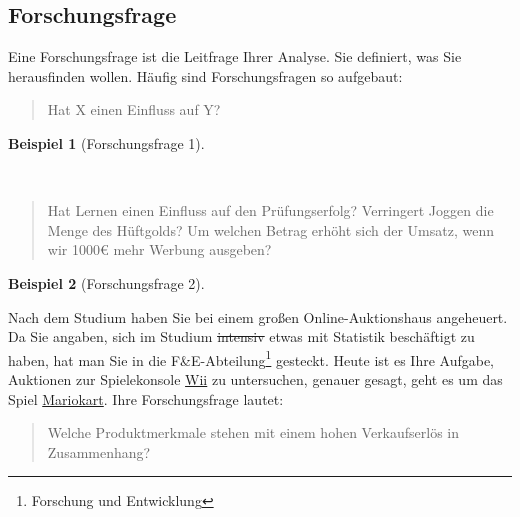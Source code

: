 \documentclass[
  a4paper,
  DIV=11]{scrreprt}
\theoremstyle{definition}
\theoremstyle{definition}
\newtheorem{example}{Beispiel}[chapter]
\theoremstyle{remark}
\begin{document}
\hypertarget{forschungsfrage}{%
\subsection{Forschungsfrage}\label{forschungsfrage}}

Eine Forschungsfrage ist die Leitfrage Ihrer Analyse. Sie definiert, was
Sie herausfinden wollen. Häufig sind Forschungsfragen so aufgebaut:

\begin{quote}
Hat X einen Einfluss auf Y?
\end{quote}

\leavevmode{}%
\begin{example}[Forschungsfrage 1]\label{exm-fofrage1}

~

\begin{quote}
Hat Lernen einen Einfluss auf den Prüfungserfolg? Verringert Joggen die
Menge des Hüftgolds? Um welchen Betrag erhöht sich der Umsatz, wenn wir
1000€ mehr Werbung ausgeben?
\end{quote}

\end{example}

\leavevmode{}%
\begin{example}[Forschungsfrage 2]\label{exm-fofrage2}

Nach dem Studium haben Sie bei einem großen Online-Auktionshaus
angeheuert. Da Sie angaben, sich im Studium \sout{intensiv} etwas mit
Statistik beschäftigt zu haben, hat man Sie in die
F\&E-Abteilung\footnote{Forschung und Entwicklung} gesteckt. Heute ist
es Ihre Aufgabe, Auktionen zur Spielekonsole
\href{https://www.nintendo.de/Wii/Wii-94559.html}{Wii} zu untersuchen,
genauer gesagt, geht es um das Spiel
\href{https://www.nintendo.de/Spiele/Wii/Mario-Kart-Wii-281848.html\#_bersicht}{Mariokart}.
Ihre Forschungsfrage lautet:

\begin{quote}
Welche Produktmerkmale stehen mit einem hohen Verkaufserlös in
Zusammenhang?
\end{quote}

\end{example}
\end{document}
